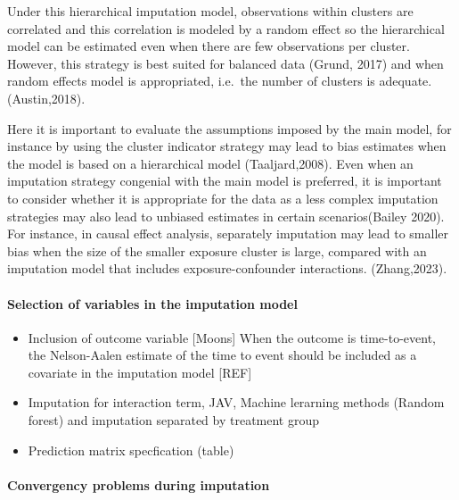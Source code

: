 \documentclass[
]{jss}
\providecommand{\tightlist}{%
  \setlength{\itemsep}{0pt}\setlength{\parskip}{0pt}}
\begin{document}
Under this hierarchical imputation model, observations within clusters
are correlated and this correlation is modeled by a random effect so the
hierarchical model can be estimated even when there are few observations
per cluster. However, this strategy is best suited for balanced data
(Grund, 2017) and when random effects model is appropriated, i.e.~the
number of clusters is adequate. (Austin,2018).

Here it is important to evaluate the assumptions imposed by the main
model, for instance by using the cluster indicator strategy may lead to
bias estimates when the model is based on a hierarchical model
(Taaljard,2008). Even when an imputation strategy congenial with the
main model is preferred, it is important to consider whether it is
appropriate for the data as a less complex imputation strategies may
also lead to unbiased estimates in certain scenarios(Bailey 2020). For
instance, in causal effect analysis, separately imputation may lead to
smaller bias when the size of the smaller exposure cluster is large,
compared with an imputation model that includes exposure-confounder
interactions. (Zhang,2023).

\hypertarget{selection-of-variables-in-the-imputation-model}{%
\paragraph{Selection of variables in the imputation
model}\label{selection-of-variables-in-the-imputation-model}}

\begin{itemize}
\tightlist
\item
  Inclusion of outcome variable {[}Moons{]} When the outcome is
  time-to-event, the Nelson-Aalen estimate of the time to event should
  be included as a covariate in the imputation model {[}REF{]}
\item
  Imputation for interaction term, JAV, Machine lerarning methods
  (Random forest) and imputation separated by treatment group
\item
  Prediction matrix specfication (table)
\end{itemize}

\hypertarget{convergency-problems-during-imputation}{%
\paragraph{Convergency problems during
imputation}\label{convergency-problems-during-imputation}}
\end{document}
